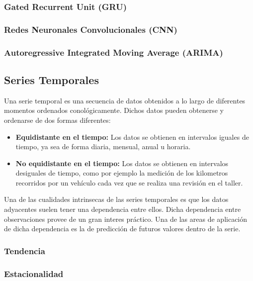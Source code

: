 \documentclass[a4paper,12pt]{article}
\begin{document}
\subsubsection{Gated Recurrent Unit (GRU)}

\subsubsection{Redes Neuronales Convolucionales (CNN)}

\subsubsection{Autoregressive Integrated Moving Average (ARIMA)}


\subsection{Series Temporales}

Una serie temporal es una secuencia de datos obtenidos
a lo largo de diferentes momentos ordenados conológicamente.
Dichos datos pueden obtenerse y ordenarse de dos formas diferentes:

\begin{itemize}
    \item \textbf{Equidistante en el tiempo:} Los datos se 
    obtienen en intervalos iguales de tiempo, ya sea de forma
    diaria, mensual, anual u horaria.

    \item \textbf{No equidistante en el tiempo:} Los datos 
    se obtienen en intervalos desiguales de tiempo, como 
    por ejemplo la medición de los kilometros recorridos por 
    un vehículo cada vez que se realiza una revisión en el 
    taller.
\end{itemize}

Una de las cualidades intrinsecas de las series temporales es 
que los datos adyacentes suelen tener una dependencia entre 
ellos. Dicha dependencia entre observaciones provee de un 
gran interes práctico. Una de las areas de aplicación de 
dicha dependencia es la de predicción de futuros valores dentro 
de la serie.

\subsubsection{Tendencia}

\subsubsection{Estacionalidad}
\end{document}
